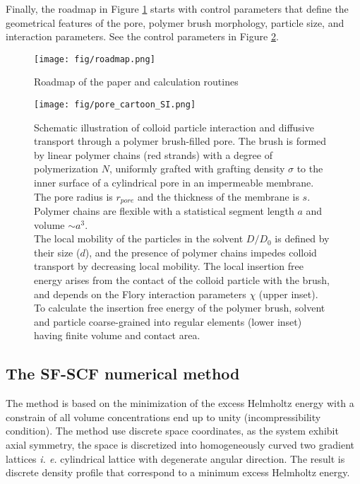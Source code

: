 \documentclass[12pt, a4paper]{article}
\begin{document}
Finally, the roadmap in Figure \ref{fig:paper_roadmap} starts with control parameters that define the geometrical features of the pore, polymer brush morphology, particle size, and interaction parameters.
See the control parameters in Figure \ref{fig:colloid_transport_SI}.

\begin{figure}
    \centering
    \texttt{[image: fig/roadmap.png]}
    \caption{
        Roadmap of the paper and calculation routines
        }
    \label{fig:paper_roadmap}
\end{figure}


\begin{figure}
    \centering
    \texttt{[image: fig/pore\_cartoon\_SI.png]}
    \caption{
        Schematic illustration of colloid particle interaction and diffusive transport through a polymer brush-filled pore. 
        The brush is formed by linear polymer chains (red strands) with a degree of polymerization $N$, uniformly grafted with grafting density $\sigma$ to the inner surface of a cylindrical pore in an impermeable membrane. 
        The pore radius is $r_{pore}$ and the thickness of the membrane is $s$.
        Polymer chains are flexible with a statistical segment length $a$ and volume $\sim a^3$.
        \\
        The local mobility of the particles in the solvent $D/D_{0}$ is defined by their size ($d$), and the presence of polymer chains impedes colloid transport by decreasing local mobility.
        The local insertion free energy arises from the contact of the colloid particle with the brush, and depends on the Flory interaction parameters $\chi$ (upper inset). 
        \\
        To calculate the insertion free energy of the polymer brush, solvent and particle coarse-grained into regular elements (lower inset) having finite volume and contact area.
        }
        \label{fig:colloid_transport_SI}
    \end{figure}


\subsection*{The SF-SCF numerical method}

The method is based on the minimization of the excess Helmholtz energy with a constrain of all volume concentrations end up to unity (incompressibility condition).
The method use discrete space coordinates, as the system exhibit axial symmetry, the space is discretized into homogeneously curved two gradient lattices \emph{i. e.} cylindrical lattice with degenerate angular direction.
The result is discrete density profile that correspond to a minimum excess Helmholtz energy.
\end{document}
